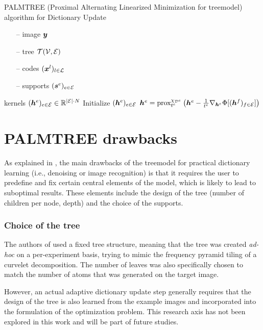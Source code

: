 \begin{algorithm}[!ht]
    \caption{\ac{PALMTREE} (Proximal Alternating Linearized Minimization for \Gls{treemodel}) algorithm for Dictionary Update}\label{alg_palmtree}
  \begin{algorithmic}[1]
    \Input
    \begin{itemize}
    	\item[--] image $\bm{y}$
    	\item[--] tree $\mathcal T(\mathcal V,\mathcal E)$
    	\item[--] codes $(\bm{x}^l)_{l \in \mathcal L}$
    	\item[--] supports $(\bm{s}^e)_{e \in \mathcal E}$
    \end{itemize}
    \Output kernels $(\bm{h}^e)_{e \in \mathcal E} \in \mathbb{R}^{|\mathcal E| \cdot N}$
    \State Initialize $(\bm{h}^e)_{e \in \mathcal E}$
      	\State $\bm{h}^e = \text{prox}^{\chi_{{\mathcal D}^e}}_{t^e} \left(\bm{h}^e-\frac{1}{t^e} \nabla_{\bm{h}^e} \Phi[(\bm{h}^f)_{f \in \mathcal E}] \right)$
      \EndFor
    \EndWhile
  \end{algorithmic}
\end{algorithm}


\section{PALMTREE drawbacks}
As explained in \cite[p. 23]{chabiron_optimization_2016}, the main drawbacks of the \gls{treemodel} for practical dictionary learning (i.e., denoising or image recognition) is that it requires the user to predefine and fix certain central elements of the model, which is likely to lead to suboptimal results. These elements include the design of the tree (number of children per node, depth) and the choice of the supports.
\subsubsection{Choice of the tree}
The authors of \cite{chabiron_optimization_2016} used a fixed tree structure, meaning that the tree was created \textit{ad-hoc} on a per-experiment basis, trying to mimic the frequency pyramid tiling of a curvelet decomposition. The number of leaves was also specifically chosen to match the number of atoms that was generated on the target image.

\noindent
However, an actual adaptive dictionary update step generally requires that the design of the tree is also learned from the example images and incorporated into the formulation of the optimization problem. This research axis has not been explored in this work and will be part of future studies.


